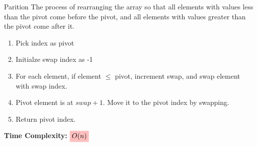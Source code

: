 \begin{theorem}
    {Parition}
    The process of rearranging the array so that all elements with values less than the pivot come before the pivot, and all elements with values greater than the pivot come after it.

    \begin{enumerate}
        \item Pick index as pivot
        \item Initialze swap index as -1
        \item For each element, if element $\leq$ pivot, increment swap, and swap element with swap index.
        \item Pivot element is at $swap + 1$. Move it to the pivot index by swapping.
        \item Return pivot index.
    \end{enumerate}

    \textbf{Time Complexity:} $\mathcolorbox{pink}{O(n)}$
\end{theorem}

